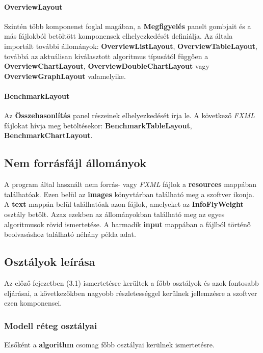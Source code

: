 \documentclass{elteikthesis}
\begin{document}
\paragraph{OverviewLayout}
Szintén több komponenst foglal magában, a \textbf{Megfigyelés} panelt gombjait és a más fájlokból betöltött komponensek elhelyezkedését definiálja. Az általa importált további állományok: \textbf{OverviewListLayout}, \textbf{OverviewTableLayout}, továbbá az aktuálisan kiválasztott algoritmus típusától függően a \textbf{OverviewChartLayout}, \textbf{OverviewDoubleChartLayout} vagy \textbf{OverviewGraphLayout} valamelyike.
\paragraph{BenchmarkLayout}
Az \textbf{Összehasonlítás} panel részeinek elhelyezkedését írja le. A következő \emph{FXML} fájlokat hívja meg betöltésekor: \textbf{BenchmarkTableLayout}, \textbf{BenchmarkChartLayout}.

\subsection{Nem forrásfájl állományok}
A program által használt nem forrás- vagy \emph{FXML} fájlok a \textbf{resources} mappában találhatóak. Ezen belül az \textbf{images} könyvtárban található meg a szoftver ikonja. A \textbf{text} mappán belül találhatóak azon fájlok, amelyeket az \textbf{InfoFlyWeight} osztály betölt. Azaz ezekben az állományokban található meg az egyes algoritmusok rövid ismertetése. A harmadik \textbf{input} mappában a fájlból történő beolvasáshoz található néhány példa adat.

\subsection{Osztályok leírása}
Az előző fejezetben (3.1) ismertetésre kerültek a főbb osztályok és azok fontosabb eljárásai, a következőkben nagyobb részletességgel kerülnek jellemzésre a szoftver ezen komponensei.
\subsubsection{Modell réteg osztályai}
Elsőként a \textbf{algorithm} csomag főbb osztályai kerülnek ismertetésre.
\end{document}
